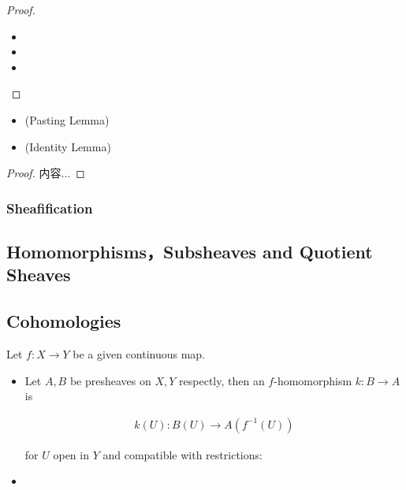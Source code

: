 \documentclass[Total.tex]{subfiles}
\begin{document}
			\begin{proof}
				\begin{itemize}
					\item 
					\item 
					\item 
				\end{itemize}
			\end{proof}
			
			\begin{proposition}
				\begin{itemize}
					\item (Pasting Lemma)
					
					\item (Identity Lemma)
				\end{itemize}
			\end{proposition}
			
			\begin{proof}
				内容...
			\end{proof}
			
			\subsubsection{Sheafification}
			
			\subsection{Homomorphisms，Subsheaves and Quotient Sheaves}
			
			\subsection{Cohomologies}
				Let $f:X\rightarrow Y$ be a given continuous map.
			
				\begin{Def}
					\begin{itemize}
						\item Let $A,B$ be presheaves on $X,Y$ respectly, then an $f$-homomorphism $k:B\rightarrow A$ is
						
						\begin{gather*}
							k(U):B(U)\rightarrow A(f^{-1}(U))
						\end{gather*}
						
						for $U$ open in $Y$ and compatible with restrictions:
						
						\begin{center}
						\end{center}
						
						\item 
					\end{itemize}
				\end{Def}
				
\end{document}
